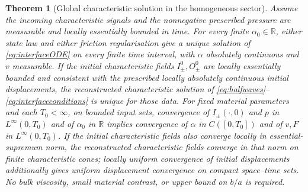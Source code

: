 \documentclass[11pt,a4paper]{article}
\newtheorem{theorem}{Theorem}[section]
\theoremstyle{definition}\newtheorem{definition}[theorem]{Definition}
\theoremstyle{remark}\newtheorem{remark}[theorem]{Remark}
\newcommand{\R}{\mathbb R}
\numberwithin{equation}{section}
\begin{document}
\begin{theorem}[Global characteristic solution in the homogeneous sector]\label{thm:characteristic}
Assume the incoming characteristic signals and the nonnegative prescribed pressure are measurable and locally essentially bounded in time. For every finite $\alpha_0\in\R$, either state law and either friction regularisation give a unique solution of \eqref{eq:interfaceODE} on every finite time interval, with $\alpha$ absolutely continuous and $v$ measurable. If the initial characteristic fields $I_\pm^0,O_\pm^0$ are locally essentially bounded and consistent with the prescribed locally absolutely continuous initial displacements, the reconstructed characteristic solution of \eqref{eq:halfwaves}--\eqref{eq:interfaceconditions} is unique for those data. For fixed material parameters and each $T_0<\infty$, on bounded input sets, convergence of $I_\pm(\cdot,0)$ and $p$ in $L^\infty(0,T_0)$ and of $\alpha_0$ in $\R$ implies convergence of $\alpha$ in $C([0,T_0])$ and of $v,F$ in $L^\infty(0,T_0)$. If the initial characteristic fields also converge locally in essential-supremum norm, the reconstructed characteristic fields converge in that norm on finite characteristic cones; locally uniform convergence of initial displacements additionally gives uniform displacement convergence on compact space--time sets. No bulk viscosity, small material contrast, or upper bound on $b/a$ is required.
\end{theorem}
\end{document}
